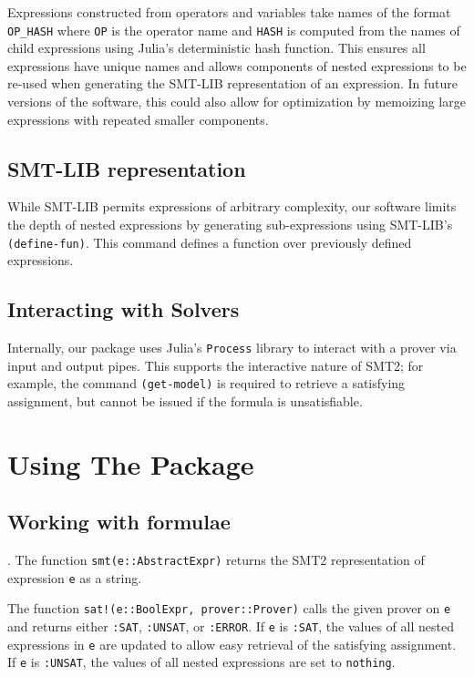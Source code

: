 \documentclass[conference]{IEEEtran}
\begin{document}
Expressions constructed from operators and variables take names of the format \verb|OP_HASH| where \verb|OP| is the operator name and \verb|HASH| is computed from the names of child expressions using Julia's deterministic hash function. This ensures all expressions have unique names and allows components of nested expressions to be re-used when generating the SMT-LIB representation of an expression. In future versions of the software, this could also allow for optimization by memoizing large expressions with repeated smaller components.

\subsection{SMT-LIB representation}

While SMT-LIB permits expressions of arbitrary complexity, our software limits the depth of nested expressions by generating sub-expressions using SMT-LIB's \verb|(define-fun)|. This command defines a function over previously defined expressions. %

\subsection{Interacting with Solvers}
Internally, our package uses Julia's \verb|Process| library to interact with a prover via input and output pipes. This supports the interactive nature of SMT2; for example, the command \verb|(get-model)| is required to retrieve a satisfying assignment, but cannot be issued if the formula is unsatisfiable.

\section{Using The Package}
\subsection{Working with formulae}.
The function \verb|smt(e::AbstractExpr)| returns the SMT2 representation of expression \verb|e| as a string.

The function \verb|sat!(e::BoolExpr, prover::Prover)| calls the given prover on \verb|e| and returns either \verb|:SAT|, \verb|:UNSAT|, or \verb|:ERROR|. If \verb|e| is \verb|:SAT|, the values of all nested expressions in \verb|e| are updated to allow easy retrieval of the satisfying assignment. If \verb|e| is \verb|:UNSAT|, the values of all nested expressions are set to \verb|nothing|.
\end{document}
